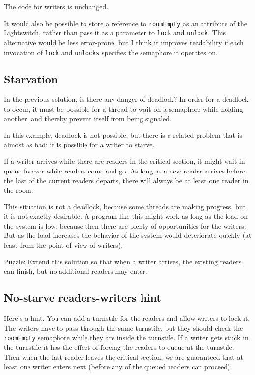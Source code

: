 \documentclass{book}
\begin{document}
The code for writers is unchanged.

It would also be possible to store a reference to {\tt roomEmpty}
as an attribute of the Lightswitch, rather than pass it as a parameter
to {\tt lock} and {\tt unlock}.  This alternative would be less
error-prone, but I think it improves readability if each invocation
of {\tt lock} and {\tt unlocks} specifies the semaphore it operates on.

\subsection{Starvation}

In the previous solution, is there any danger of deadlock?
In order for a deadlock to occur, it must be possible for a
thread to wait on a semaphore while holding another, and thereby
prevent itself from being signaled.

In this example, deadlock is not possible, but there is a related
problem that is almost as bad: it is possible for a writer to
starve.

If a writer arrives while there are readers in the critical section,
it might wait in queue forever while readers come and go.  As long
as a new reader arrives before the last of the current readers
departs, there will always be at least one reader in the room.

This situation is not a deadlock, because some threads are making
progress, but it is not exactly desirable.  A program like this
might work as long as the load on the system is low, because then there
are plenty of opportunities for the writers.  But as the load
increases the behavior of the system would deteriorate quickly
(at least from the point of view of writers).

Puzzle: Extend this solution so that when a writer arrives,
the existing readers can finish, but no additional readers
may enter.



\subsection {No-starve readers-writers hint}

Here's a hint.  You can add a turnstile for the readers and
allow writers to lock it.  The writers have to pass through
the same turnstile, but they should check the {\tt roomEmpty}
semaphore while they are inside the turnstile.  If a writer
gets stuck in the turnstile it has the effect of forcing the
readers to queue at the turnstile.  Then when the last reader
leaves the critical section, we are guaranteed that at least
one writer enters next (before any of the queued readers can
proceed).
\end{document}
